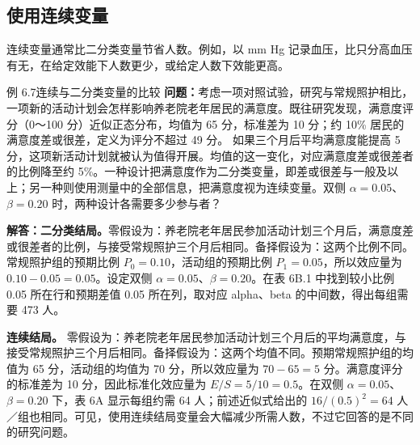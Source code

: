 \subsection{使用连续变量}
连续变量通常比二分类变量节省人数。例如，以 mm Hg 记录血压，比只分高血压有无，在给定效能下人数更少，或给定人数下效能更高。
\begin{bookbox}{例 6.7\quad 连续与二分类变量的比较}
\textbf{问题：}考虑一项对照试验，研究与常规照护相比，一项新的活动计划会怎样影响养老院老年居民的满意度。既往研究发现，满意度评分（0～100 分）近似正态分布，均值为 65 分，标准差为 10 分；约 10\% 居民的满意度差或很差，定义为评分不超过 49 分。
如果三个月后平均满意度能提高 5 分，这项新活动计划就被认为值得开展。均值的这一变化，对应满意度差或很差者的比例降至约 5\%。一种设计把满意度作为二分类变量，即差或很差与一般及以上；另一种则使用测量中的全部信息，把满意度视为连续变量。双侧 $\alpha=0.05$、$\beta=0.20$ 时，两种设计各需要多少参与者？

\textbf{解答：二分类结局。}零假设为：养老院老年居民参加活动计划三个月后，满意度差或很差者的比例，与接受常规照护三个月后相同。备择假设为：这两个比例不同。常规照护组的预期比例 $P_0=0.10$，活动组的预期比例 $P_1=0.05$，所以效应量为 $0.10-0.05=0.05$。设定双侧 $\alpha=0.05$、$\beta=0.20$。在表 6B.1 中找到较小比例 0.05 所在行和预期差值 0.05 所在列，取对应 alpha、beta 的中间数，得出每组需要 473 人。

\textbf{连续结局。}
零假设为：养老院老年居民参加活动计划三个月后的平均满意度，与接受常规照护三个月后相同。备择假设为：这两个均值不同。预期常规照护组的均值为 65 分，活动组的均值为 70 分，所以效应量为 $70-65=5$ 分。满意度评分的标准差为 10 分，因此标准化效应量为 $E/S=5/10=0.5$。在双侧 $\alpha=0.05$、$\beta=0.20$ 下，表 6A 显示每组约需 64 人；前述近似式给出的 $16/(0.5)^2=64$ 人／组也相同。可见，使用连续结局变量会大幅减少所需人数，不过它回答的是不同的研究问题。
\end{bookbox}

